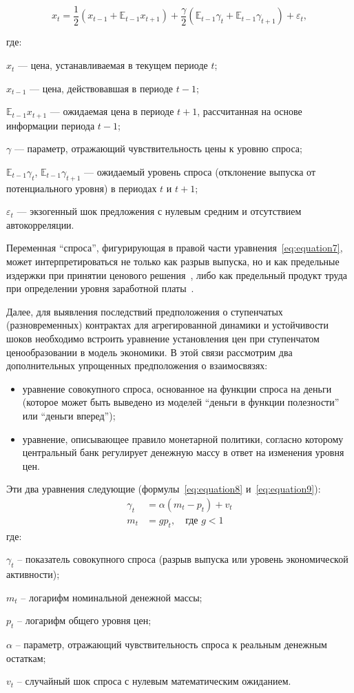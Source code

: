 \begin{equation}
	\label{eq:equation7}
	x_t = \frac{1}{2}(x_{t-1} + \mathbb{E}_{t-1}x_{t+1}) + \frac{\gamma}{2}(\mathbb{E}_{t-1}\gamma_t + \mathbb{E}_{t-1}\gamma_{t+1}) + \varepsilon_t,
\end{equation}

где:
\par
$x_t$ — цена, устанавливаемая в текущем периоде $t$;
\par
$x_{t-1}$ — цена, действовавшая в периоде $t-1$;
\par
$\mathbb{E}_{t-1}x_{t+1}$ — ожидаемая цена в периоде $t+1$, рассчитанная на основе информации периода $t-1$;
\par
$\gamma$ — параметр, отражающий чувствительность цены к уровню спроса;
\par
$\mathbb{E}_{t-1}\gamma_t$, $\mathbb{E}_{t-1}\gamma_{t+1}$ — ожидаемый уровень спроса (отклонение выпуска от потенциального уровня) в периодах $t$ и $t+1$;
\par
$\varepsilon_t$ — экзогенный шок предложения с нулевым средним и отсутствием автокорреляции.


Переменная \enquote{спроса}, фигурирующая в правой части уравнения~\eqref{eq:equation7}, может интерпретироваться не только как разрыв выпуска, но и как предельные издержки при принятии ценового решения~\cite{woodford2005interest}, либо как предельный продукт труда при определении уровня заработной платы~\cite{ERCEG2000281}.

Далее, для выявления последствий предположения о ступенчатых (разновременных) контрактах для агрегированной динамики и устойчивости шоков необходимо встроить уравнение установления цен при ступенчатом ценообразовании в модель экономики. В этой связи рассмотрим два дополнительных упрощенных предположения о взаимосвязях:
\begin{itemize}
	\item уравнение совокупного спроса, основанное на функции спроса на деньги (которое может быть выведено из моделей \enquote{деньги в функции полезности} или \enquote{деньги вперед});
	\item уравнение, описывающее правило монетарной политики, согласно которому центральный банк регулирует денежную массу в ответ на изменения уровня цен.
\end{itemize}

Эти два уравнения следующие (формулы~\eqref{eq:equation8} и~\eqref{eq:equation9}):
\begin{align}
	\gamma_t &= \alpha(m_t - p_t) + v_t \label{eq:equation8} \\
	m_t &= g p_t, \quad \text{где } g < 1 \label{eq:equation9}
\end{align}
где:
\par
$\gamma_t$ -- показатель совокупного спроса (разрыв выпуска или уровень экономической активности);
\par
$m_t$ -- логарифм номинальной денежной массы;
\par
$p_t$ -- логарифм общего уровня цен;
\par
$\alpha$ -- параметр, отражающий чувствительность спроса к реальным денежным остаткам;
\par
$v_t$ -- случайный шок спроса с нулевым математическим ожиданием.

